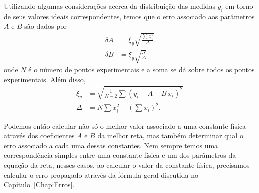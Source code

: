 Utilizando algumas considerações\cite{Taylor} acerca da distribuição das medidas $y_i$ em torno de seus valores ideais correspondentes, temos que o erro associado aos parâmetros $A$ e $B$ são dados por
\begin{align}
	\delta A &= \xi_y\sqrt{\frac{\sum x_i^2}{\Delta}} \\
	\delta B &= \xi_y\sqrt{\frac{N}{\Delta}}
\end{align}
%
onde $N$ é o número de pontos experimentais e a soma se dá sobre todos os pontos experimentais. Além disso,
\begin{align}
	\xi_y &= \sqrt{\frac{1}{N-2}\sum(y_i-A-B\,x_i)^2} \\
	\Delta &= N\sum x_i^2 - \left(\sum x_i\right)^2.
\end{align}

Podemos então calcular não só o melhor valor associado a uma constante física através dos coeficientes $A$ e $B$ da melhor reta, mas também determinar qual o erro associado a cada uma dessas constantes. Nem sempre temos uma correspondência simples entre uma constante física e um dos parâmetros da equação da reta, nesses casos, ao calcular o valor da constante física, precisamos calcular o erro propagado através da fórmula geral discutida no Capítulo~\ref{Chap:Erros}.


